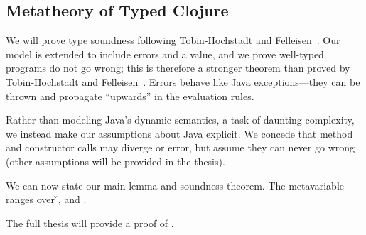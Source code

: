 \subsection{Metatheory of Typed Clojure}
\label{sec:metatheory}

We will prove type soundness following Tobin-Hochstadt and Felleisen~\cite{TF10}. Our model is extended
to include errors \errorvalv{} and a \wrong{} value, and we prove well-typed
programs do not go wrong; this is therefore a stronger theorem than
proved by Tobin-Hochstadt and Felleisen~\cite{TF10}. 
Errors behave like Java exceptions---they can be thrown and propagate ``upwards'' in the evaluation rules.

Rather than modeling Java's dynamic semantics, a task of daunting
complexity, we instead make our assumptions about Java explicit. We
concede that method and constructor calls may diverge or error, but
assume they can never go wrong
(other assumptions will be provided in the thesis).






We can now state our main lemma and soundness theorem.  The
metavariable  ranges over \v{}, \errorvalv{} and
\wrong{}. 

\begin{lemma}\label{main:lemma:soundness}

  {\soundnesslemmahypothesis}
\end{lemma}


{}

The full thesis will provide a proof of .


%
